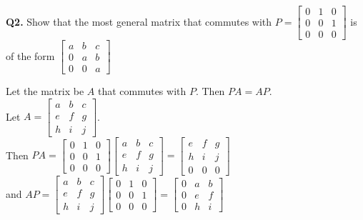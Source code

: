 \documentclass[addpoints]{exam}
\begin{document}
\begin{sloppypar}
\begin{questions}
    \question
    \textbf{Q2. } Show that the most general matrix that commutes with $ P = \begin{bmatrix}
        0 & 1 & 0 \\ 0 & 0 & 1 \\ 0 & 0 & 0
    \end{bmatrix} $ is of the form $ \begin{bmatrix}
        a & b & c \\ 0 & a & b \\ 0 & 0 & a
    \end{bmatrix} $
    \begin{solution}
        Let the matrix be $A$ that commutes with $P$. Then $ PA = AP $. \\ 
        Let $ A = \begin{bmatrix}
            a & b & c \\ e & f & g \\ h & i & j
        \end{bmatrix} $. \\ 
        Then $ PA = \begin{bmatrix}
            0 & 1 & 0 \\ 0 & 0 & 1 \\ 0 & 0 & 0
        \end{bmatrix} \begin{bmatrix}
            a & b & c \\ e & f & g \\ h & i & j
        \end{bmatrix} = \begin{bmatrix}
            e & f & g \\ h & i & j \\ 0 & 0 & 0
        \end{bmatrix}$ \\ 
        and $ AP = \begin{bmatrix}
            a & b & c \\ e & f & g \\ h & i & j
        \end{bmatrix} \begin{bmatrix}
            0 & 1 & 0 \\ 0 & 0 & 1 \\ 0 & 0 & 0
        \end{bmatrix} = \begin{bmatrix}
            0 & a & b \\ 0 & e & f \\ 0 & h & i
        \end{bmatrix}$ \\ 

\end{solution}
\end{questions}
\end{sloppypar}
\end{document}
